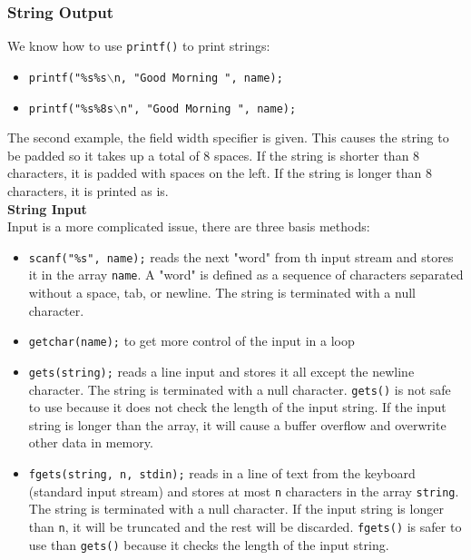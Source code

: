 \documentclass[a4paper, 10pt]{article}
\begin{document}
\subsubsection{String Output}
We know how to use \texttt{printf()} to print strings:
\begin{itemize}
    \item \texttt{printf("\%s\%s$\backslash$n, "Good Morning ", name);}
    \item \texttt{printf("\%s\%8s$\backslash$n", "Good Morning ", name);}
\end{itemize}
The second example, the field width specifier is given. This causes the string to be padded so it takes up a total of 8 spaces. If the string is shorter than 8 characters, it is padded with spaces on the left. If the string is longer than 8 characters, it is printed as is. \\[2ex]
\textbf{String Input} \\
Input is a more complicated issue, there are three basis methods:
\begin{itemize}
    \item \texttt{scanf("\%s", name);} reads the next "word" from th input stream and stores it in the array \texttt{name}. A "word" is defined as a sequence of characters separated without a space, tab, or newline. The string is terminated with a null character.
    \item \texttt{getchar(name);} to get more control of the input in a loop
    \item \texttt{gets(string);} reads a line input and stores it all except the newline character. The string is terminated with a null character. \texttt{gets()} is not safe to use because it does not check the length of the input string. If the input string is longer than the array, it will cause a buffer overflow and overwrite other data in memory.
    \item \texttt{fgets(string, n, stdin);} reads in a line of text from the keyboard (standard input stream) and stores at most \texttt{n} characters in the array \texttt{string}. The string is terminated with a null character. If the input string is longer than \texttt{n}, it will be truncated and the rest will be discarded. \texttt{fgets()} is safer to use than \texttt{gets()} because it checks the length of the input string.
\end{itemize}
\end{document}
